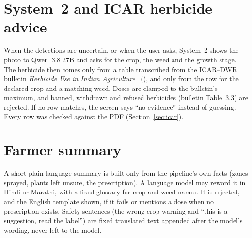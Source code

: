 \section{System~2 and ICAR herbicide advice}
When the detections are uncertain, or when the user asks, System~2 shows the photo to Qwen~3.8 27B and
asks for the crop, the weed and the growth stage. The herbicide then comes only from a table
transcribed from the ICAR--DWR bulletin \emph{Herbicide Use in Indian Agriculture}~\cite{choudhury2016icar}
(), and only from the row for the declared crop and a matching
weed. Doses are clamped to the bulletin's maximum, and banned, withdrawn and refused herbicides (bulletin
Table~3.3) are rejected. If no row matches, the screen says ``no evidence'' instead of guessing. Every
row was checked against the PDF (Section~\ref{sec:icar}).

\section{Farmer summary}
A short plain-language summary is built only from the pipeline's own facts (zones sprayed, plants left
unsure, the prescription). A language model may reword it in Hindi or Marathi, with a fixed glossary
for crop and weed names. It is rejected, and the English template shown, if it fails or mentions a
dose when no prescription exists. Safety sentences (the wrong-crop warning and ``this is a suggestion,
read the label'') are fixed translated text appended after the model's wording, never left to the
model.

